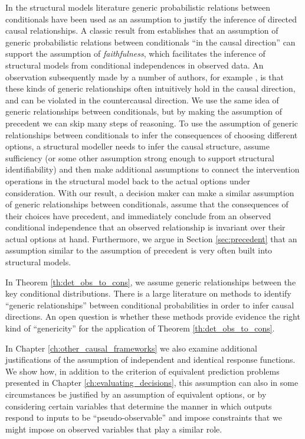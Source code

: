 In the structural models literature generic probabilistic relations between conditionals have been used as an assumption to justify the inference of directed causal relationships. A classic result from \citet{meek_strong_1995} establishes that an assumption of generic probabilistic relations between conditionals ``in the causal direction'' can support the assumption of \emph{faithfulness}, which facilitates the inference of structural models from conditional independences in observed data. An observation subsequently made by a number of authors, for example \citet{lemeire_replacing_2013}, is that these kinds of generic relationships often intuitively hold in the causal direction, and can be violated in the countercausal direction. We use the same idea of generic relationships between conditionals, but by making the assumption of precedent we can skip many steps of reasoning. To use the assumption of generic relationships between conditionals to infer the consequences of choosing different options, a structural modeller needs to infer the causal structure, assume sufficiency (or some other assumption strong enough to support structural identifiability) and then make additional assumptions to connect the intervention operations in the structural model back to the actual options under consideration. With our result, a decision maker can make a similar assumption of generic relationships between conditionals, assume that the consequences of their choices have precedent, and immediately conclude from an observed conditional independence that an observed relationship is invariant over their actual options at hand. Furthermore, we argue in Section \ref{sec:precedent} that an assumption similar to the assumption of precedent is very often built into structural models.

In Theorem \ref{th:det_obs_to_cons}, we assume generic relationships between the key conditional distributions. There is a large literature on methods to identify ``generic relationships'' between conditional probabilities in order to infer causal directions. An open question is whether these methods provide evidence the right kind of ``genericity'' for the application of Theorem \ref{th:det_obs_to_cons}.

In Chapter \ref{ch:other_causal_frameworks} we also examine additional justifications of the assumption of independent and identical response functions. We show how, in addition to the criterion of equivalent prediction problems presented in Chapter \ref{ch:evaluating_decisions}, this assumption can also in some circumstances be justified by an assumption of equivalent options, or by considering certain variables that determine the manner in which outputs respond to inputs to be ``pseudo-observable'' and impose constraints that we might impose on observed variables that play a similar role.

